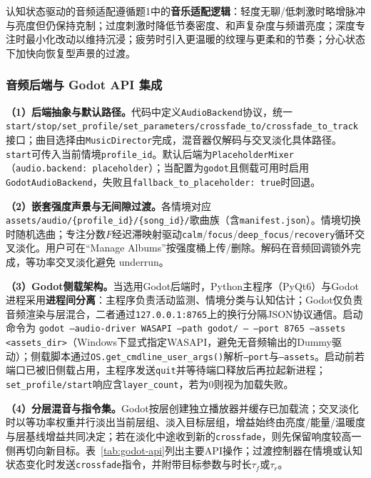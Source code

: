 \documentclass[12pt, fontset=windows]{ctexart}
\begin{document}
认知状态驱动的音频适配遵循题1中的\textbf{音乐适配逻辑}：轻度无聊/低刺激时略增脉冲与亮度但仍保持克制；过度刺激时降低节奏密度、和声复杂度与频谱亮度；深度专注时最小化改动以维持沉浸；疲劳时引入更温暖的纹理与更柔和的节奏；分心状态下加快向恢复型声景的过渡。

\subsubsection{音频后端与 Godot API 集成}

\textbf{（1）后端抽象与默认路径。}代码中定义\texttt{AudioBackend}协议，统一\texttt{start/stop/set\_profile/set\_parameters/crossfade\_to/crossfade\_to\_track}接口；曲目选择由\texttt{MusicDirector}完成，混音器仅解码与交叉淡化具体路径。\texttt{start}可传入当前情境\texttt{profile\_id}。默认后端为\texttt{PlaceholderMixer}（\texttt{audio.backend: placeholder}）；当配置为\texttt{godot}且侧载可用时启用\texttt{GodotAudioBackend}，失败且\texttt{fallback\_to\_placeholder: true}时回退。

\textbf{（2）嵌套强度声景与无间隙过渡。}各情境对应\texttt{assets/audio/\{profile\_id\}/\{song\_id\}/}歌曲族（含\texttt{manifest.json}）。情境切换时随机选曲；专注分数$F$经迟滞映射驱动\texttt{calm}/\texttt{focus}/\texttt{deep\_focus}/\texttt{recovery}循环交叉淡化。用户可在“Manage Albums”按强度桶上传/删除。解码在音频回调锁外完成，等功率交叉淡化避免 underrun。

\textbf{（3）Godot侧载架构。}当选用Godot后端时，Python主程序（PyQt6）与Godot进程采用\textbf{进程间分离}：主程序负责活动监测、情境分类与认知估计；Godot仅负责音频渲染与层混合，二者通过\texttt{127.0.0.1:8765}上的换行分隔JSON协议通信。启动命令为
\texttt{godot --audio-driver WASAPI --path godot/ -- --port 8765 --assets <assets\_dir>}（Windows下显式指定WASAPI，避免无音频输出的Dummy驱动）；侧载脚本通过\texttt{OS.get\_cmdline\_user\_args()}解析\texttt{--port}与\texttt{--assets}。启动前若端口已被旧侧载占用，主程序发送\texttt{quit}并等待端口释放后再拉起新进程；\texttt{set\_profile/start}响应含\texttt{layer\_count}，若为0则视为加载失败。

\textbf{（4）分层混音与指令集。}Godot按层创建独立播放器并缓存已加载流；交叉淡化时以等功率权重并行淡出当前层组、淡入目标层组，增益始终由亮度/能量/温暖度与层基线增益共同决定；若在淡化中途收到新的\texttt{crossfade}，则先保留响度较高一侧再切向新目标。表~\ref{tab:godot-api}列出主要API操作；过渡控制器在情境或认知状态变化时发送\texttt{crossfade}指令，并附带目标参数与时长$\tau_f$或$\tau_r$。
\end{document}
